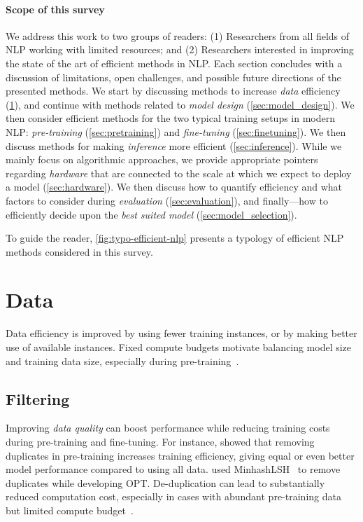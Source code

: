 \paragraph{Scope of this survey} 

We address this work to two groups of readers: (1) Researchers from all fields of NLP working with limited resources; and (2) Researchers interested in improving the state of the art of efficient methods in NLP. Each section concludes with a discussion of limitations, open challenges, and possible future directions of the presented methods. We start by discussing methods to increase \textit{data} efficiency (\ref{sec:data}), and continue with methods related to \textit{model design} (\ref{sec:model_design}). We then consider efficient methods for the two typical training setups in modern NLP: \textit{pre-training }(\ref{sec:pretraining}) and \textit{fine-tuning} (\ref{sec:finetuning}). We then discuss methods for making \textit{inference} more efficient (\ref{sec:inference}). 
While we mainly focus on algorithmic approaches, we provide appropriate pointers regarding \textit{hardware} that are connected to the scale at which we expect to deploy a model (\ref{sec:hardware}). We then discuss how to quantify efficiency and what factors to consider during \textit{evaluation} (\ref{sec:evaluation}), and finally---how to efficiently decide upon the \textit{best suited model} (\ref{sec:model_selection}). 

To guide the reader, \ref{fig:typo-efficient-nlp} presents a typology of efficient NLP methods considered in this survey.

\section{Data} \label{sec:data}
Data efficiency is improved by using fewer training instances, or by making better use of available instances. Fixed compute budgets motivate balancing model size and training data size, especially during pre-training~\citep{Hoffmann2022}.

\subsection{Filtering}
Improving \textit{data quality} can boost performance while reducing training costs during pre-training and fine-tuning. For instance, \citet{lee-etal-2022-deduplicating} showed that removing duplicates in pre-training increases training efficiency, giving equal or even better model performance compared to using all data. 
\citet{zhang2022opt} used MinhashLSH~\citep{leskovec2020mining} to remove duplicates while developing OPT. De-duplication can lead to substantially reduced computation cost, especially in cases with abundant pre-training data but limited compute budget~\citep{Hoffmann2022}.

